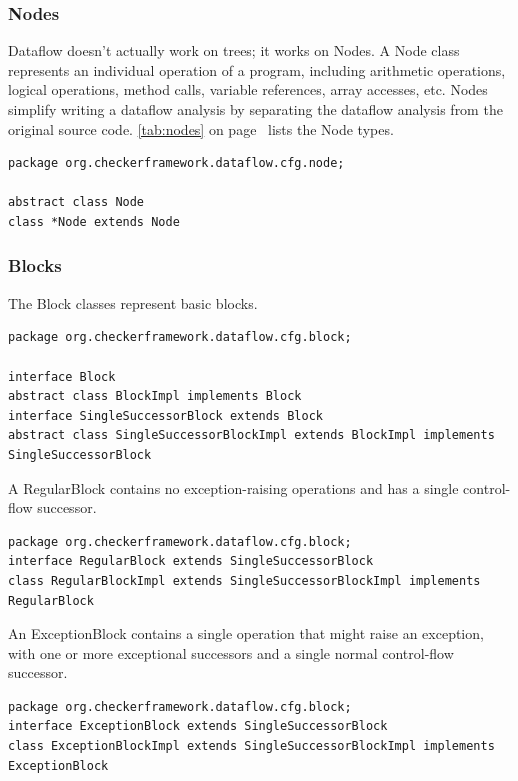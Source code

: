 \subsubsection{Nodes}
\label{sec:node_classes}

Dataflow doesn't actually work on trees; it works on Nodes.
A Node class represents an individual operation of a program,
including arithmetic operations, logical operations, method calls,
variable references, array accesses, etc.
Nodes
simplify writing a dataflow analysis by separating the dataflow
analysis from the original source code.
\autoref{tab:nodes} on page~\pageref{tab:nodes} lists
the Node types.

\begin{verbatim}
package org.checkerframework.dataflow.cfg.node;

abstract class Node
class *Node extends Node
\end{verbatim}


\subsubsection{Blocks}
\label{sec:block_classes}

The Block
classes represent basic blocks.

\begin{verbatim}
package org.checkerframework.dataflow.cfg.block;

interface Block
abstract class BlockImpl implements Block
interface SingleSuccessorBlock extends Block
abstract class SingleSuccessorBlockImpl extends BlockImpl implements SingleSuccessorBlock
\end{verbatim}

A RegularBlock contains no exception-raising operations and has a
single control-flow successor.

\begin{verbatim}
package org.checkerframework.dataflow.cfg.block;
interface RegularBlock extends SingleSuccessorBlock
class RegularBlockImpl extends SingleSuccessorBlockImpl implements RegularBlock
\end{verbatim}

An ExceptionBlock contains a single operation that might raise an
exception, with one or more exceptional successors and a single normal
control-flow successor.

\begin{verbatim}
package org.checkerframework.dataflow.cfg.block;
interface ExceptionBlock extends SingleSuccessorBlock
class ExceptionBlockImpl extends SingleSuccessorBlockImpl implements ExceptionBlock
\end{verbatim}

